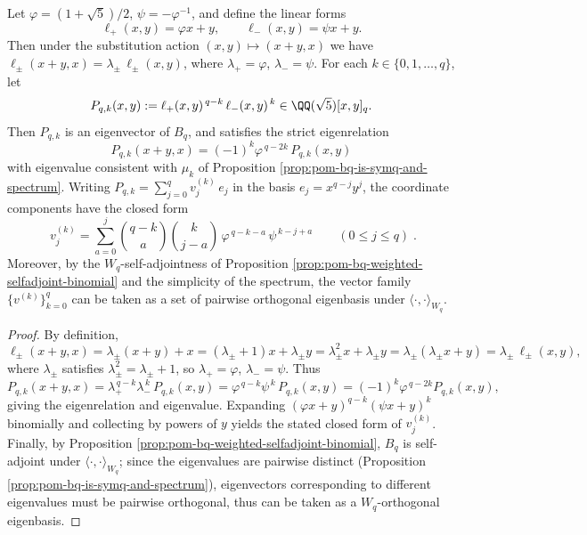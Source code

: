 \begin{proposition}\label{prop:pom-bq-explicit-diagonalization-linear-forms}
Let \(\varphi=(1+\sqrt5)/2\), \(\psi=-\varphi^{-1}\), and define the linear forms
\[
\ell_+(x,y)=\varphi x+y,\qquad \ell_-(x,y)=\psi x+y.
\]
Then under the substitution action \((x,y)\mapsto(x+y,x)\) we have
\(
\ell_\pm(x+y,x)=\lambda_\pm\,\ell_\pm(x,y)
\), where \(\lambda_+=\varphi\), \(\lambda_-=\psi\).
For each \(k\in\{0,1,\dots,q\}\), let
\[
P_{q,k}(x,y):=\ell_+(x,y)^{\,q-k}\,\ell_-(x,y)^{\,k}\in\QQ(\sqrt5)[x,y]_q.
\]
Then \(P_{q,k}\) is an eigenvector of \(B_q\), and satisfies the strict eigenrelation
\[
\boxed{\;P_{q,k}(x+y,x)=(-1)^k\varphi^{\,q-2k}\,P_{q,k}(x,y)\;}
\]
with eigenvalue consistent with \(\mu_k\) of Proposition \ref{prop:pom-bq-is-symq-and-spectrum}.
Writing \(P_{q,k}=\sum_{j=0}^{q} v^{(k)}_j\,e_j\) in the basis \(e_j=x^{q-j}y^j\), the coordinate components have the closed form
\[
\boxed{\;
v^{(k)}_j
=\sum_{a=0}^{j}
\binom{q-k}{a}\binom{k}{j-a}\,
\varphi^{\,q-k-a}\,
\psi^{\,k-j+a}\qquad(0\le j\le q)\; } .
\]
Moreover, by the \(W_q\)-self-adjointness of Proposition \ref{prop:pom-bq-weighted-selfadjoint-binomial} and the simplicity of the spectrum, the vector family \(\{v^{(k)}\}_{k=0}^{q}\) can be taken as a set of pairwise orthogonal eigenbasis under \(\langle\cdot,\cdot\rangle_{W_q}\).
\end{proposition}
\begin{proof}
By definition,
\[
\ell_\pm(x+y,x)=\lambda_\pm(x+y)+x=(\lambda_\pm+1)x+\lambda_\pm y=\lambda_\pm^2 x+\lambda_\pm y=\lambda_\pm(\lambda_\pm x+y)=\lambda_\pm\,\ell_\pm(x,y),
\]
where \(\lambda_\pm\) satisfies \(\lambda_\pm^2=\lambda_\pm+1\), so \(\lambda_+=\varphi\), \(\lambda_-=\psi\).
Thus
\[
P_{q,k}(x+y,x)=\lambda_+^{\,q-k}\lambda_-^{\,k}\,P_{q,k}(x,y)=\varphi^{\,q-k}\psi^{\,k}\,P_{q,k}(x,y)=(-1)^k\varphi^{\,q-2k}P_{q,k}(x,y),
\]
giving the eigenrelation and eigenvalue.
Expanding
\(
(\varphi x+y)^{q-k}(\psi x+y)^k
\)
binomially and collecting by powers of \(y\) yields the stated closed form of \(v^{(k)}_j\).
Finally, by Proposition \ref{prop:pom-bq-weighted-selfadjoint-binomial}, \(B_q\) is self-adjoint under \(\langle\cdot,\cdot\rangle_{W_q}\); since the eigenvalues are pairwise distinct (Proposition \ref{prop:pom-bq-is-symq-and-spectrum}), eigenvectors corresponding to different eigenvalues must be pairwise orthogonal, thus can be taken as a \(W_q\)-orthogonal eigenbasis.
\end{proof}

